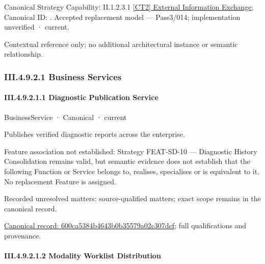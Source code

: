 {\small Canonical Strategy Capability: II.1.2.3.1 \hyperref[element:883265005129434382aa86d2bcadb989]{[CT2] External Information Exchange}; Canonical ID: \texttt{}. Accepted replacement model — Pass3/014; implementation unverified · current.}\par
Contextual reference only; no additional architectural instance or semantic relationship.\par
\subsubsection*{III.4.9.2.1 Business Services}
\label{navigation:III.4.9.2.1}

\paragraph*{III.4.9.2.1.1 Diagnostic Publication Service}
\label{navigation:III.4.9.2.1.1}

\label{element:600ca5384b4643b0b35579a02c307dcf}
{\small BusinessService · Canonical · current}\par

Publishes verified diagnostic reports across the enterprise.



Feature association not established: Strategy FEAT-SD-10 — Diagnostic History Consolidation remains valid, but semantic evidence does not establish that the following Function or Service belongs to, realises, specialises or is equivalent to it. No replacement Feature is assigned.


{\small Recorded unresolved matters: source-qualified matters; exact scope remains in the canonical record.}\par
{\footnotesize \href{../../../../continuum/business/business-service/600ca5384b4643b0b35579a02c307dcf.md}{Canonical record: 600ca5384b4643b0b35579a02c307dcf}; full qualifications and provenance.}\par
\paragraph*{III.4.9.2.1.2 Modality Worklist Distribution}
\label{navigation:III.4.9.2.1.2}

